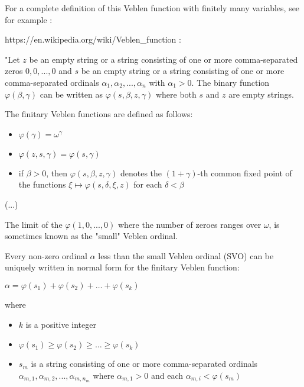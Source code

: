 \documentclass[10pt]{article}
\begin{document}
\bigskip

For a complete definition of this Veblen function with finitely many variables, see for example :

https://en.wikipedia.org/wiki/Veblen\_function :

"Let \(z\) be an empty string or a string consisting of one or more comma-separated zeros \(0,0,...,0\) and \(s\) be an empty string or a string consisting of one or more comma-separated ordinals \(\alpha _{1},\alpha _{2},...,\alpha _{n}\) with \(\alpha _{1}>0\). The binary function \(\varphi (\beta ,\gamma )\) can be written as \(\varphi (s,\beta ,z,\gamma )\) where both \(s\) and \(z\) are empty strings.

The finitary Veblen functions are defined as follows:

\begin{itemize}
     \setlength{\itemsep}{1pt}
     \setlength{\parskip}{0pt}
     \setlength{\parsep}{0pt}

\item \(\varphi (\gamma )=\omega ^{\gamma }\)
\item \(\varphi (z,s,\gamma )=\varphi (s,\gamma )\)
\item if \(\beta >0\), then \(\varphi (s,\beta ,z,\gamma )\) denotes the \((1+\gamma )\)-th common fixed point of the functions \(\xi \mapsto \varphi (s,\delta ,\xi ,z)\) for each \(\delta <\beta\)

\end{itemize}

(...)

The limit of the \(\varphi(1,0,...,0)\) where the number of zeroes ranges over \( \omega \), is sometimes known as the "small" Veblen ordinal.

Every non-zero ordinal \(\alpha\) less than the small Veblen ordinal (SVO) can be uniquely written in normal form for the finitary Veblen function:

\(\alpha =\varphi (s_{1})+\varphi (s_{2})+ \ldots +\varphi (s_{k})\)

where

\begin{itemize}
     \setlength{\itemsep}{1pt}
     \setlength{\parskip}{0pt}
     \setlength{\parsep}{0pt}

\item \(k\) is a positive integer
\item \(\varphi (s_{1})\geq \varphi (s_{2})\geq \ldots \geq \varphi (s_{k})\)
\item \(s_{m}\) is a string consisting of one or more comma-separated ordinals \(\alpha _{m,1},\alpha _{m,2},...,\alpha _{m,n_{m}}\) where \(\alpha _{m,1}>0\) and each \(\alpha _{m,i}<\varphi (s_{m})\)

\end{itemize} 
\end{document}

